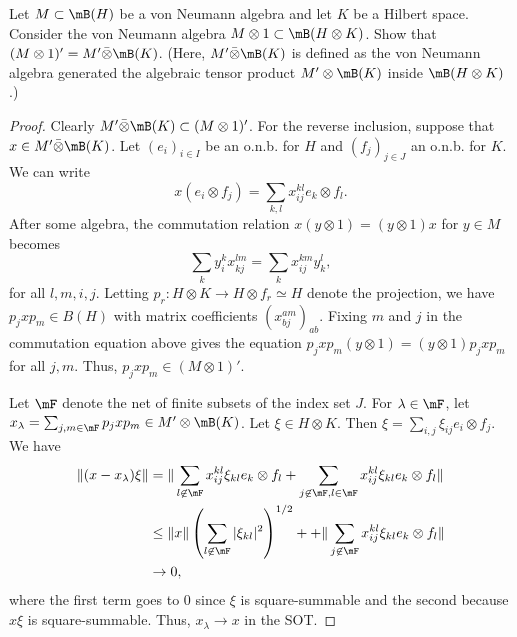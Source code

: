 \documentclass{article}
\begin{document}
 Let $M \subset \mB(H)$ be a von Neumann algebra and let $K$ be a Hilbert space. Consider the von
Neumann algebra $M \otimes 1 \subset \mB(H \otimes K)$. Show that $(M \otimes 1)' = M' \bar{\otimes} \mB(K)$.
(Here, $M' \bar{\otimes} \mB(K)$ is defined as the von Neumann algebra generated the algebraic
tensor product $M' \otimes \mB(K)$ inside $\mB(H \otimes K)$.)
\begin{proof}
  Clearly $M' \bar\otimes \mB(K) \subset (M \otimes 1)'$.  For the reverse inclusion, suppose that $x \in M' \bar\otimes \mB(K)$.
  Let $(e_i)_{i \in I}$ be an o.n.b. for $H$ and $(f_j)_{j \in J}$ an o.n.b. for $K$.  We can write
  $$x (e_i \otimes f_j) = \sum_{k,l} x^{kl}_{ij} e_k \otimes f_l.$$
  After some algebra, the commutation relation $x (y \otimes 1) = (y \otimes 1) x$ for $y \in M$ becomes
  $$\sum_k y_i^k x^{lm}_{kj} = \sum_k x_{ij}^{km} y^l_k,$$
  for all $l,m,i,j$.   Letting $p_r: H \otimes K \to H \otimes f_r \simeq H$ denote the projection, we have
  $p_j x p_m \in B(H)$ with matrix coefficients $(x^{a m}_{b j})_{ab}$.  Fixing $m$ and $j$ in the commutation equation above
  gives the equation $p_j x p_m (y \otimes 1) = (y \otimes 1) p_j x p_m$ for all $j,m$.  Thus, $p_j x p_m \in (M \otimes 1)'$.

  Let $\mF$ denote the net of finite subsets of the index set $J$.  For $\lambda \in \mF$, let
  $x_\lambda = \sum_{j,m \in \mF} p_j x p_m \in M' \otimes \mB(K)$.  Let $\xi \in H \otimes K$.
  Then $\xi = \sum_{i,j} \xi_{ij} e_i \otimes f_j$.  We have
  \begin{align*}
    \|(x - x_\lambda) \xi \| & = \| \sum_{l \not\in \mF} x^{kl}_{ij} \xi_{kl} e_k \otimes f_l
    + \sum_{j \not \in \mF, l \in \mF} x^{kl}_{ij} \xi_{kl} e_k \otimes f_l  \| \\
    & \le \|x\|  \left( \sum_{l \not\in \mF} |\xi_{kl}|^2 \right)^{1/2} + + \| \sum_{j \not \in \mF} x^{kl}_{ij} \xi_{kl} e_k \otimes f_l  \| \\
    & \to 0,
  \end{align*}
  where the first term goes to 0 since $\xi$ is square-summable and the second because $x \xi$ is square-summable.
  Thus, $x_\lambda \to x$ in the SOT. 
\end{proof}
\end{document}
